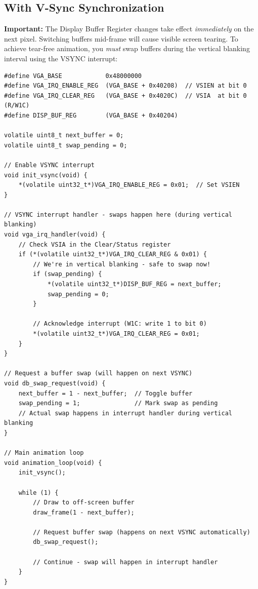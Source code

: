 \documentclass[11pt,letterpaper]{report}
\begin{document}
\subsection{With V-Sync Synchronization}

\textbf{Important:} The Display Buffer Register changes take effect \textit{immediately} on the next pixel. Switching buffers mid-frame will cause visible screen tearing. To achieve tear-free animation, you \textit{must} swap buffers during the vertical blanking interval using the VSYNC interrupt:

\begin{lstlisting}[style=c,caption={V-Sync Synchronized Buffer Swap Using Interrupt}]
#define VGA_BASE            0x48000000
#define VGA_IRQ_ENABLE_REG  (VGA_BASE + 0x40208)  // VSIEN at bit 0
#define VGA_IRQ_CLEAR_REG   (VGA_BASE + 0x4020C)  // VSIA  at bit 0 (R/W1C)
#define DISP_BUF_REG        (VGA_BASE + 0x40204)

volatile uint8_t next_buffer = 0;
volatile uint8_t swap_pending = 0;

// Enable VSYNC interrupt
void init_vsync(void) {
    *(volatile uint32_t*)VGA_IRQ_ENABLE_REG = 0x01;  // Set VSIEN
}

// VSYNC interrupt handler - swaps happen here (during vertical blanking)
void vga_irq_handler(void) {
    // Check VSIA in the Clear/Status register
    if (*(volatile uint32_t*)VGA_IRQ_CLEAR_REG & 0x01) {
        // We're in vertical blanking - safe to swap now!
        if (swap_pending) {
            *(volatile uint32_t*)DISP_BUF_REG = next_buffer;
            swap_pending = 0;
        }

        // Acknowledge interrupt (W1C: write 1 to bit 0)
        *(volatile uint32_t*)VGA_IRQ_CLEAR_REG = 0x01;
    }
}

// Request a buffer swap (will happen on next VSYNC)
void db_swap_request(void) {
    next_buffer = 1 - next_buffer;  // Toggle buffer
    swap_pending = 1;               // Mark swap as pending
    // Actual swap happens in interrupt handler during vertical blanking
}

// Main animation loop
void animation_loop(void) {
    init_vsync();
    
    while (1) {
        // Draw to off-screen buffer
        draw_frame(1 - next_buffer);
        
        // Request buffer swap (happens on next VSYNC automatically)
        db_swap_request();
        
        // Continue - swap will happen in interrupt handler
    }
}

\end{lstlisting}
\end{document}
